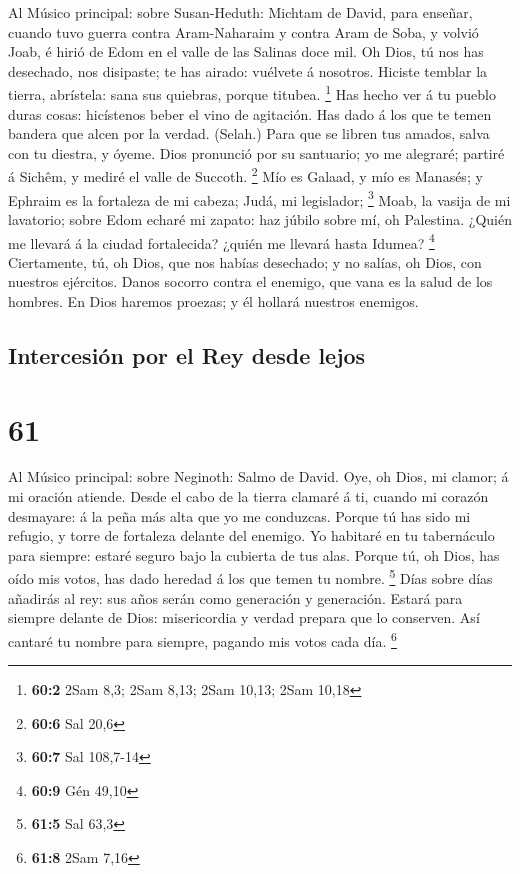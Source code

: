  Al Músico principal: sobre Susan-Heduth: Michtam de David,
para enseñar, cuando tuvo guerra contra Aram-Naharaim y contra Aram de
Soba, y volvió Joab, é hirió de Edom en el valle de las Salinas doce
mil. Oh Dios, tú nos has desechado, nos disipaste; te has airado:
vuélvete á nosotros.  Hiciste temblar la tierra, abrístela:
sana sus quiebras, porque titubea. \footnote{\textbf{60:2} 2Sam 8,3;
  2Sam 8,13; 2Sam 10,13; 2Sam 10,18}  Has hecho ver á tu
pueblo duras cosas: hicístenos beber el vino de agitación. 
Has dado á los que te temen bandera que alcen por la verdad. (Selah.)
 Para que se libren tus amados, salva con tu diestra, y
óyeme.  Dios pronunció por su santuario; yo me alegraré;
partiré á Sichêm, y mediré el valle de Succoth. \footnote{\textbf{60:6}
  Sal 20,6}  Mío es Galaad, y mío es Manasés; y Ephraim es
la fortaleza de mi cabeza; Judá, mi legislador; \footnote{\textbf{60:7}
  Sal 108,7-14}  Moab, la vasija de mi lavatorio; sobre Edom
echaré mi zapato: haz júbilo sobre mí, oh Palestina.  ¿Quién
me llevará á la ciudad fortalecida? ¿quién me llevará hasta Idumea?
\footnote{\textbf{60:9} Gén 49,10}  Ciertamente, tú, oh
Dios, que nos habías desechado; y no salías, oh Dios, con nuestros
ejércitos.  Danos socorro contra el enemigo, que vana es la
salud de los hombres.  En Dios haremos proezas; y él
hollará nuestros enemigos.

\hypertarget{intercesiuxf3n-por-el-rey-desde-lejos}{%
\subsection{Intercesión por el Rey desde
lejos}\label{intercesiuxf3n-por-el-rey-desde-lejos}}

\hypertarget{section-60}{%
\section{61}\label{section-60}}

 Al Músico principal: sobre Neginoth: Salmo de David. Oye,
oh Dios, mi clamor; á mi oración atiende.  Desde el cabo de
la tierra clamaré á ti, cuando mi corazón desmayare: á la peña más alta
que yo me conduzcas.  Porque tú has sido mi refugio, y torre
de fortaleza delante del enemigo.  Yo habitaré en tu
tabernáculo para siempre: estaré seguro bajo la cubierta de tus alas.
 Porque tú, oh Dios, has oído mis votos, has dado heredad á
los que temen tu nombre. \footnote{\textbf{61:5} Sal 63,3} 
Días sobre días añadirás al rey: sus años serán como generación y
generación.  Estará para siempre delante de Dios:
misericordia y verdad prepara que lo conserven.  Así cantaré
tu nombre para siempre, pagando mis votos cada día. \footnote{\textbf{61:8}
  2Sam 7,16}

